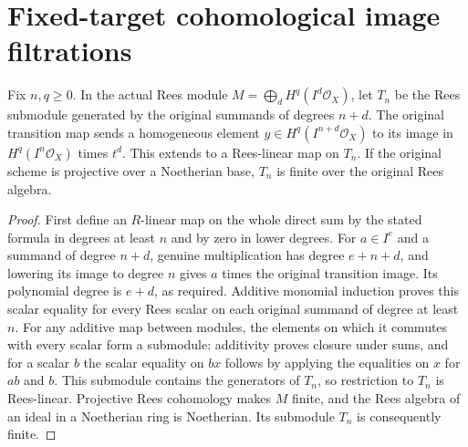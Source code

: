 \section{Fixed-target cohomological image filtrations}

\begin{lemma}
\label{lem:fc-formal-functions-fixed-tail}
\leanok
{}
Fix $n,q\geq0$.  In the actual Rees module
$M=\bigoplus_d H^q(I^d\mathcal O_X)$, let $T_n$ be the Rees submodule
generated by the original summands of degrees $n+d$.  The original
transition map sends a homogeneous element $y\in H^q(I^{n+d}\mathcal O_X)$
to its image in $H^q(I^n\mathcal O_X)$ times $t^d$.  This extends to a
Rees-linear map on $T_n$.  If the original scheme is projective over a
Noetherian base, $T_n$ is finite over the original Rees algebra.
\end{lemma}
\begin{proof}
First define an $R$-linear map on the whole direct sum by the stated
formula in degrees at least $n$ and by zero in lower degrees.  For
$a\in I^e$ and a summand of degree $n+d$, genuine multiplication has
degree $e+n+d$, and lowering its image to degree $n$ gives $a$ times
the original transition image.  Its polynomial degree is $e+d$, as
required.  Additive monomial induction proves this scalar equality for
every Rees scalar on each original summand of degree at least $n$.
For any additive map between modules, the elements on which it
commutes with every scalar form a submodule: additivity proves closure
under sums, and for a scalar $b$ the scalar equality on $bx$ follows
by applying the equalities on $x$ for $ab$ and $b$.  This submodule
contains the generators of $T_n$, so restriction to $T_n$ is
Rees-linear.  Projective Rees cohomology makes $M$ finite, and the
Rees algebra of an ideal in a Noetherian ring is Noetherian.  Its
submodule $T_n$ is consequently finite.
\end{proof}

